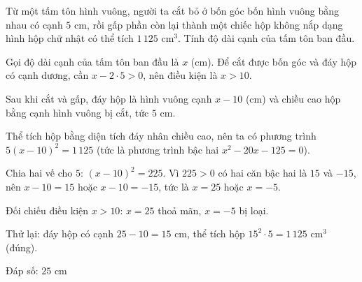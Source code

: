 \begin{problem}[9DS-PT2-030]
Từ một tấm tôn hình vuông, người ta cắt bỏ ở bốn góc bốn hình vuông bằng nhau có cạnh $5$ cm, rồi gấp phần còn lại thành một chiếc hộp không nắp dạng hình hộp chữ nhật có thể tích $1\,125 \text{ cm}^3$. Tính độ dài cạnh của tấm tôn ban đầu.

\begin{solution}
Gọi độ dài cạnh của tấm tôn ban đầu là $x$ (cm). Để cắt được bốn góc và đáy hộp có cạnh dương, cần $x - 2 \cdot 5 > 0$, nên điều kiện là $x > 10$.

Sau khi cắt và gấp, đáy hộp là hình vuông cạnh $x - 10$ (cm) và chiều cao hộp bằng cạnh hình vuông bị cắt, tức $5$ cm.

Thể tích hộp bằng diện tích đáy nhân chiều cao, nên ta có phương trình $5(x - 10)^2 = 1\,125$ (tức là phương trình bậc hai $x^2 - 20x - 125 = 0$).

Chia hai vế cho $5$: $(x - 10)^2 = 225$. Vì $225 > 0$ có hai căn bậc hai là $15$ và $-15$, nên $x - 10 = 15$ hoặc $x - 10 = -15$, tức là $x = 25$ hoặc $x = -5$.

Đối chiếu điều kiện $x > 10$: $x = 25$ thoả mãn, $x = -5$ bị loại.

Thử lại: đáy hộp có cạnh $25 - 10 = 15$ cm, thể tích hộp $15^2 \cdot 5 = 1\,125 \text{ cm}^3$ (đúng).

Đáp số: $\boxed{25 \text{ cm}}$
\end{solution}
\end{problem}

